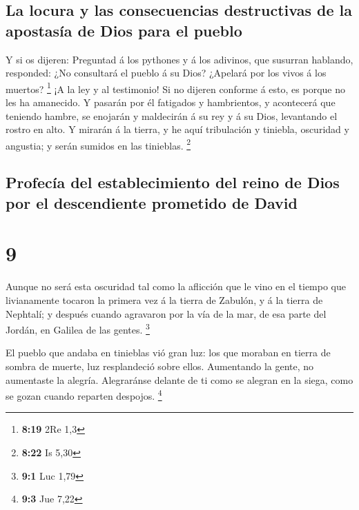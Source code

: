 \hypertarget{la-locura-y-las-consecuencias-destructivas-de-la-apostasuxeda-de-dios-para-el-pueblo}{%
\subsection{La locura y las consecuencias destructivas de la apostasía
de Dios para el
pueblo}\label{la-locura-y-las-consecuencias-destructivas-de-la-apostasuxeda-de-dios-para-el-pueblo}}

 Y si os dijeren: Preguntad á los pythones y á los
adivinos, que susurran hablando, responded: ¿No consultará el pueblo á
su Dios? ¿Apelará por los vivos á los muertos? \footnote{\textbf{8:19}
  2Re 1,3}  ¡A la ley y al testimonio! Si no dijeren
conforme á esto, es porque no les ha amanecido.  Y
pasarán por él fatigados y hambrientos, y acontecerá que teniendo
hambre, se enojarán y maldecirán á su rey y á su Dios, levantando el
rostro en alto.  Y mirarán á la tierra, y he aquí
tribulación y tiniebla, oscuridad y angustia; y serán sumidos en las
tinieblas. \footnote{\textbf{8:22} Is 5,30}

\hypertarget{profecuxeda-del-establecimiento-del-reino-de-dios-por-el-descendiente-prometido-de-david}{%
\subsection{Profecía del establecimiento del reino de Dios por el
descendiente prometido de
David}\label{profecuxeda-del-establecimiento-del-reino-de-dios-por-el-descendiente-prometido-de-david}}

\hypertarget{section-8}{%
\section{9}\label{section-8}}

 Aunque no será esta oscuridad tal como la aflicción que
le vino en el tiempo que livianamente tocaron la primera vez á la tierra
de Zabulón, y á la tierra de Nephtalí; y después cuando agravaron por la
vía de la mar, de esa parte del Jordán, en Galilea de las gentes.
\footnote{\textbf{9:1} Luc 1,79}

 El pueblo que andaba en tinieblas vió gran luz: los que
moraban en tierra de sombra de muerte, luz resplandeció sobre ellos.
 Aumentando la gente, no aumentaste la alegría.
Alegraránse delante de ti como se alegran en la siega, como se gozan
cuando reparten despojos. \footnote{\textbf{9:3} Jue 7,22}

